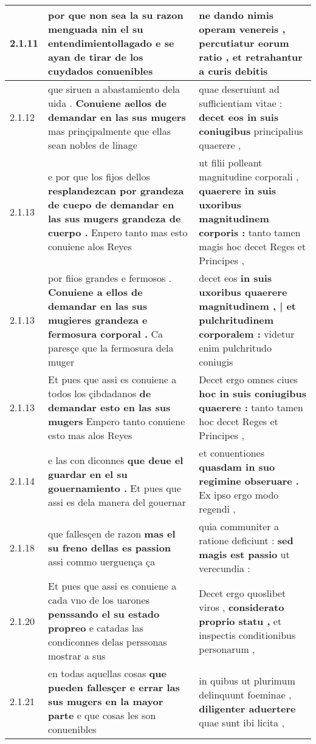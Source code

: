 \begin{tabular}{|p{1cm}|p{6.5cm}|p{6.5cm}|}
2.1.11 & por que non sea la su razon menguada \textbf{ nin el su entendimientollagado } e se ayan de tirar de los cuydados conuenibles & ne dando nimis operam venereis , \textbf{ percutiatur eorum ratio , } et retrahantur a curis debitis \\\hline
2.1.12 & que siruen a abastamiento dela uida . \textbf{ Conuiene aellos de demandar en las sus mugers } mas prinçipalmente que ellas sean nobles de linage & quae deseruiunt ad sufficientiam vitae : \textbf{ decet eos in suis coniugibus } principalius quaerere , \\\hline
2.1.13 & e por que los fijos dellos \textbf{ resplandezcan por grandeza de cuepo de demandar en las sus mugers grandeza de cuerpo . } Enpero tanto mas esto conuiene alos Reyes & ut filii polleant magnitudine corporali , \textbf{ quaerere in suis uxoribus magnitudinem corporis : } tanto tamen magis hoc decet Reges et Principes , \\\hline
2.1.13 & por fiios grandes e fermosos . \textbf{ Conuiene a ellos de demandar en las sus mugieres grandeza e fermosura corporal . } Ca paresçe que la fermosura dela muger & decet eos \textbf{ in suis uxoribus quaerere magnitudinem , | et pulchritudinem corporalem : } videtur enim pulchritudo coniugis \\\hline
2.1.13 & Et pues que assi es conuiene a todos los çibdadanos \textbf{ de demandar esto en las sus mugers } Empero tanto conuiene esto mas alos Reyes & Decet ergo omnes ciues \textbf{ hoc in suis coniugibus quaerere : } tanto tamen hoc decet Reges et Principes , \\\hline
2.1.14 & e las con diconnes \textbf{ que deue el guardar en el su gouernamiento . } Et pues que assi es dela manera del gouernar & et conuentiones \textbf{ quasdam in suo regimine obseruare . } Ex ipso ergo modo regendi , \\\hline
2.1.18 & que fallesçen de razon \textbf{ mas el su freno dellas es passion } assi commo uerguença ça & quia communiter a ratione deficiunt : \textbf{ sed magis est passio } ut verecundia : \\\hline
2.1.20 & Et pues que assi es conuiene a cada vno de los uarones \textbf{ penssando el su estado propreo } e catadas las condiconnes delas perssonas mostrar a sus & Decet ergo quoslibet viros , \textbf{ considerato proprio statu , } et inspectis conditionibus personarum , \\\hline
2.1.21 & en todas aquellas cosas \textbf{ que pueden fallesçer e errar las sus mugers en la mayor parte } e que cosas les son conuenibles & in quibus ut plurimum delinquunt foeminae , \textbf{ diligenter aduertere } quae sunt ibi licita , \\\hline

\end{tabular}
